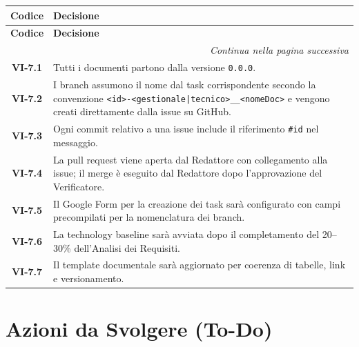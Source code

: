 \renewcommand{\arraystretch}{1.3}
\vspace{-0.3cm}
\noindent
\begin{longtable}{c p{12cm}}
	\toprule
	\textbf{Codice} & \textbf{Decisione} \\
	\midrule
	\endfirsthead

    \toprule
    \textbf{Codice} & \textbf{Decisione} \\
    \midrule
    \endhead

    \midrule
    \multicolumn{2}{r}{\textit{Continua nella pagina successiva}} \\
    \midrule
    \endfoot

	\bottomrule
    \endlastfoot

	\textbf{VI-7.1} & Tutti i documenti partono dalla versione \texttt{0.0.0}. \\[4pt]
	\textbf{VI-7.2} & I branch assumono il nome dal task corrispondente secondo
					la convenzione \texttt{<id>-<gestionale|tecnico>\_<esterno|interno>\_<nomeDoc>}
					e vengono creati direttamente dalla issue su GitHub. \\[4pt]
	\textbf{VI-7.3} & Ogni commit relativo a una issue include il riferimento
					\texttt{\#id} nel messaggio. \\[4pt]
	\textbf{VI-7.4} & La pull request viene aperta dal Redattore con collegamento
					alla issue; il merge è eseguito dal Redattore dopo
					l'approvazione del Verificatore. \\[4pt]
	\textbf{VI-7.5} & Il Google Form per la creazione dei task sarà configurato
					con campi precompilati per la nomenclatura dei branch. \\[4pt]
	\textbf{VI-7.6} & La technology baseline sarà avviata dopo il completamento
					del 20--30\% dell'Analisi dei Requisiti. \\[4pt]
	\textbf{VI-7.7} & Il template documentale sarà aggiornato per coerenza
					di tabelle, link e versionamento. \\
\end{longtable}
 
\section{Azioni da Svolgere (To-Do)}


